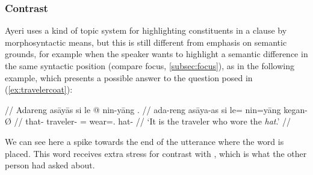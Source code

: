 
\subsubsection{Contrast}

Ayeri uses a kind of topic system for highlighting constituents in a clause by
morphosyntactic means, but this is still different from emphasis on semantic
grounds, for example when the speaker wants to highlight a semantic difference
in the same syntactic position (compare focus, \autoref{subsec:focus}), as in
the following example, which presents a possible answer to the question posed in
(\ref{ex:travelercoat}):

\ex\begingl
	\glpreamble{} //
	\gla Adareng asāyās si le @ nin-yāng . //
	\glb ada-reng asāya-as si le= nin=yāng kegan-Ø //
	\glc that-\AargI{} traveler-\Parg{} \Rel{} \PatTI{}= wear=\TsgM{}.\Aarg{} 
		hat-\Top{} //
	\glft `It is the traveler who wore the \emph{hat}.' //
\endgl\xe

We can see here a spike towards the end of the utterance where the word 
 is placed. This word receives extra stress for 
contrast with , which is what the other person had asked 
about.

